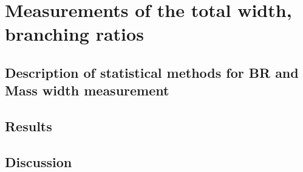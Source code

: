 \section{Measurements of the total width, branching ratios}
\label{subsec:widthbr}

\subsection{Description of statistical methods for BR and Mass width measurement}

\clearpage

\subsection{Results}

\clearpage

\subsection{Discussion}

\clearpage

